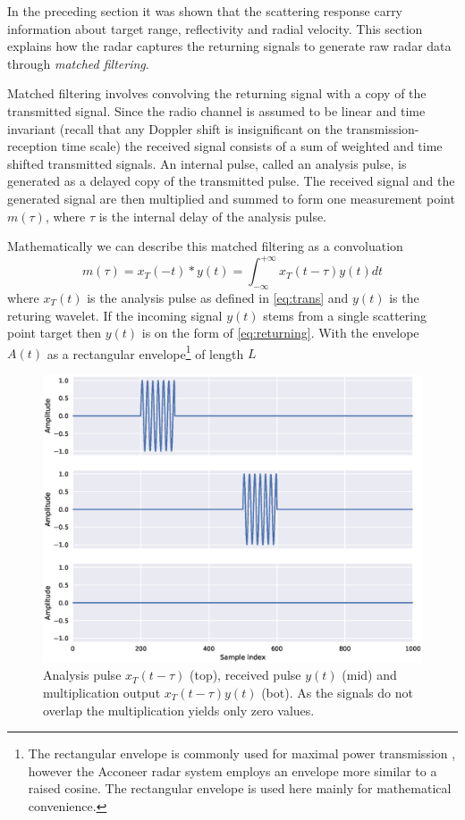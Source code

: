 In the preceding section it was shown that the scattering response carry information about target range, reflectivity and radial velocity. This section explains how the radar captures the returning signals to generate raw radar data through \emph{matched filtering}.

Matched filtering involves convolving the returning signal with a copy of the transmitted signal. Since the radio channel is assumed to be linear and time invariant (recall that any Doppler shift is insignificant on the transmission-reception time scale) the received signal consists of a sum of weighted and time shifted transmitted signals. An internal pulse, called an analysis pulse, is generated as a delayed copy of the transmitted pulse. The received signal and the generated signal are then multiplied and summed to form one measurement point $m(\tau)$, where $\tau$ is the internal delay of the analysis pulse. 

Mathematically we can describe this matched filtering as a convoluation
\begin{equation}
	m(\tau) 
	= x_T(-t) * y(t)
	= \int_{-\infty}^{+\infty} x_T(t - \tau)y(t) dt
\end{equation}
where $x_T(t)$ is the analysis pulse as defined in \eqref{eq:trans} and $y(t)$ is the returing wavelet. If the incoming signal $y(t)$ stems from a single scattering point target then $y(t)$ is on the form of \eqref{eq:returning}. With the envelope $A(t)$ as a rectangular envelope\footnote{The rectangular envelope is commonly used for maximal power transmission \citep{richards_2014}, however the Acconeer radar system employs an envelope more similar to a raised cosine. The rectangular envelope is used here mainly for mathematical convenience.} of length $L$

\begin{figure}[t]
	\centering
	\includegraphics[scale=0.5]{figs_temp/mixing0}
	\caption{Analysis pulse $x_T(t-\tau)$ (top), received pulse $y(t)$ (mid) and multiplication output $x_T(t-\tau)y(t)$ (bot). As the signals do not overlap the multiplication yields only zero values.}
	\label{fig:mix0}
\end{figure}

